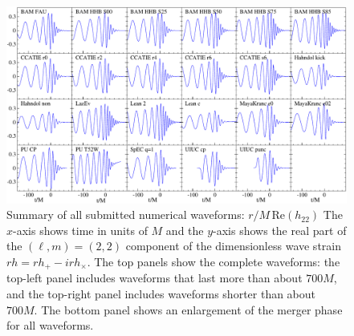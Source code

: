 \begin{figure}
\includegraphics[width=\textwidth]{figures/ninja1/Prune_Re_h22-Merger}
\caption[Summary of waveforms contributed to NINJA1]{
\label{fig:NR-Reh22}
Summary of all submitted numerical waveforms:
\boldmath$r/M\,\mbox{Re}(h_{22})$ The $x$-axis shows time in units of
$M$ and the $y$-axis shows the real part of the $(\ell,m)=(2,2)$
component of the dimensionless wave strain $r h = r h_+ - i r
h_\times$.  The top panels show the complete waveforms: the top-left
panel includes waveforms that last more than about $700M$, and the
top-right panel includes waveforms shorter than about $700M$. The
bottom panel shows an enlargement of the merger phase for all
waveforms.}
\end{figure}


